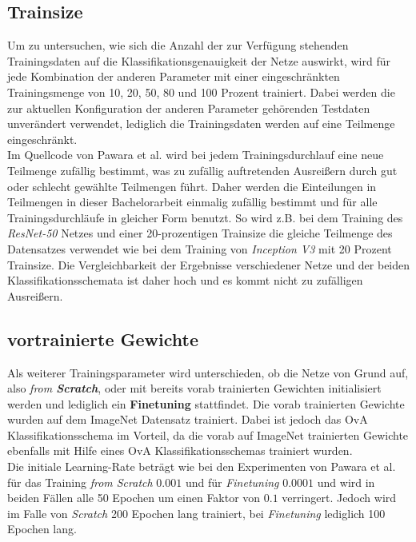 \subsection{Trainsize}
Um zu untersuchen, wie sich die Anzahl der zur Verfügung stehenden Trainingsdaten auf die Klassifikationsgenauigkeit der Netze auswirkt, wird für jede Kombination der anderen Parameter mit einer eingeschränkten Trainingsmenge von 10, 20, 50, 80 und 100 Prozent trainiert. Dabei werden die zur aktuellen Konfiguration der anderen Parameter gehörenden Testdaten unverändert verwendet, lediglich die Trainingsdaten werden auf eine Teilmenge eingeschränkt.\\

Im Quellcode von Pawara et al. \cite{pawaraWebsiteCode} wird bei jedem Trainingsdurchlauf eine neue Teilmenge zufällig bestimmt, was zu zufällig auftretenden Ausreißern durch gut oder schlecht gewählte Teilmengen führt.
Daher werden die Einteilungen in Teilmengen in dieser Bachelorarbeit einmalig zufällig bestimmt und für alle Trainingsdurchläufe in gleicher Form benutzt. So wird z.B. bei dem Training des \textit{ResNet-50} Netzes und einer 20-prozentigen Trainsize die gleiche Teilmenge des Datensatzes verwendet wie bei dem Training von \textit{Inception V3} mit 20 Prozent Trainsize. Die Vergleichbarkeit der Ergebnisse verschiedener Netze und der beiden Klassifikationsschemata ist daher hoch und es kommt nicht zu zufälligen Ausreißern.


\subsection{vortrainierte Gewichte}
Als weiterer Trainingsparameter wird unterschieden, ob die Netze von Grund auf, also \textit{from \textbf{Scratch}}, oder mit bereits vorab trainierten Gewichten initialisiert werden und lediglich ein \textbf{Finetuning} stattfindet. Die vorab trainierten Gewichte wurden auf dem ImageNet Datensatz \cite{imagenet} trainiert.
Dabei ist jedoch das OvA Klassifikationsschema im Vorteil, da die vorab auf ImageNet \cite{imagenet} trainierten Gewichte ebenfalls mit Hilfe eines OvA Klassifikationsschemas trainiert wurden.\\

Die initiale Learning-Rate beträgt wie bei den Experimenten von Pawara et al. \cite{pawaraPaper} für das Training \textit{from Scratch} $0.001$ und für \textit{Finetuning} $0.0001$ und wird in beiden Fällen alle 50 Epochen um einen Faktor von $0.1$ verringert. Jedoch wird im Falle von \textit{Scratch} 200 Epochen lang trainiert, bei \textit{Finetuning} lediglich 100 Epochen lang.



